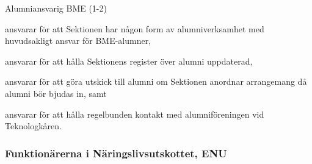 \documentclass[10pt]{article}
\begin{document}
\begin{emptylist}
\begin{dashlist}
        \end{dashlist}
    \item Alumniansvarig BME (1-2)
        \begin{dashlist}
            \item ansvarar för att Sektionen har någon form av alumniverksamhet med huvudsakligt ansvar för BME-alumner,
            \item ansvarar för att hålla Sektionens register över alumni uppdaterad,
            \item ansvarar för att göra utskick till alumni om Sektionen anordnar arrangemang då alumni
bör bjudas in, samt
            \item  ansvarar för att hålla regelbunden kontakt med alumniföreningen vid Teknologkåren.
        \end{dashlist}
\end{emptylist}

\subsubsection{Funktionärerna i Näringslivsutskottet, ENU}
\end{document}
